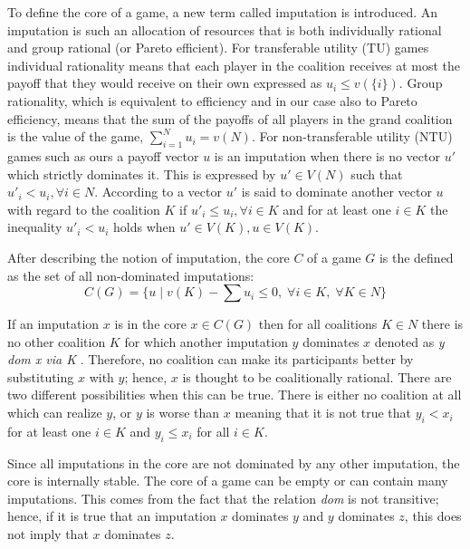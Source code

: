 {To define the core of a game, a new term called imputation is introduced. An imputation is such an allocation of resources that is both individually rational and group rational (or Pareto efficient). For transferable utility (TU) games individual rationality means that each player in the coalition receives at most the payoff that they would receive on their own expressed as $u_i \leq v(\{i\})$. Group rationality, which is equivalent to efficiency and in our case also to Pareto efficiency, means that the sum of the payoffs of all players in the grand coalition is the value of the game, $\sum_{i=1}^{N} u_i = v(N)$. For non-transferable utility (NTU) games such as ours a payoff vector $u$ is an imputation when there is no vector $u'$ which strictly dominates it. This is expressed by $u' \in V(N)$ such that $u'_i < u_i, \forall i\in N$. According to \citet{holler2006einfuhrung} a vector $u'$ is said to dominate another vector $u$ with regard to the coalition $K$ if $u'_i \leq u_i, \forall i \in K$ and for at least one $i \in K$ the inequality $u'_i < u_i$ holds when $u' \in V(K), u \in V(K)$.

After describing the notion of imputation, the core $C$ of a game $G$ is the defined as the set of all non-dominated imputations:
\begin{equation}
\label{eq:core}
C(G) = \{u \;|\; v(K) - \sum u_i \leq 0, \; \forall i \in K, \; \forall K \in N \}
\end{equation}

If an imputation $x$ is in the core $x \in C(G)$ then for all coalitions $K \in N$ there is no other coalition $K$ for which another imputation $y$ dominates $x$ denoted as \textit{y dom x via K} \citep{holler2006einfuhrung}. Therefore, no coalition can make its participants better by substituting $x$ with $y$; hence, $x$ is thought to be coalitionally rational. There are two different possibilities when this can be true. There is either no coalition at all which can realize $y$, or $y$ is worse than $x$ meaning that it is not true that $y_i < x_i$ for at least one $i \in K$ and $y_i \leq x_i$ for all $i \in K$. 

Since all imputations in the core are not dominated by any other imputation, the core is internally stable. The core of a game can be empty or can contain many imputations. This comes from the fact that the relation \textit{dom} is not transitive; hence, if it is true that an imputation $x$ dominates $y$ and $y$ dominates $z$, this does not imply that $x$ dominates $z$.

}
